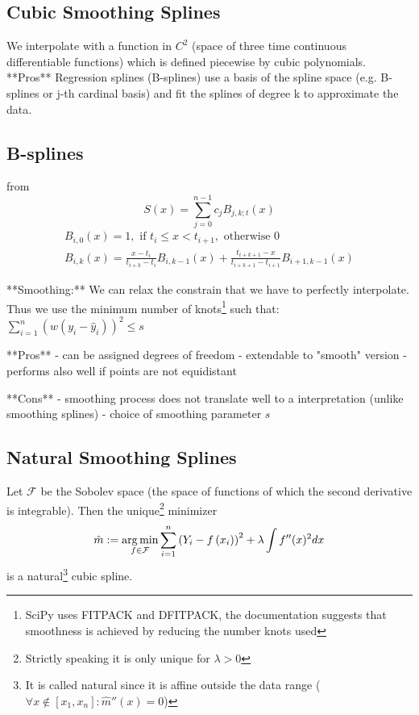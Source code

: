
\subsection{Cubic Smoothing Splines}
\label{sec:Cubic}
We interpolate with a function in $C^2$ (space of three time continuous differentiable functions) which is defined piecewise by cubic polynomials.
**Pros**
Regression splines (B-splines)
\cite{woodSmoothingParameterModel2016}
use a basis of the spline space (e.g. B-splines or j-th cardinal basis) and fit the splines of degree k to approximate the data.

\subsection{B-splines}
\label{sec:B}
from \cite{lycheSplineMethods2005}
$$
    S(x)=\sum_{j=0}^{n-1} c_{j} B_{j, k ; t}(x)
$$
$$
    \begin{array}{r}
        B_{i, 0}(x)=1, \text { if } t_{i} \leq x<t_{i+1}, \text { otherwise } 0 \\
        B_{i, k}(x)=\frac{x-t_{i}}{t_{i+k}-t_{i}} B_{i, k-1}(x)+\frac{t_{i+k+1}-x}{t_{i+k+1}-t_{i+1}} B_{i+1, k-1}(x)
    \end{array}
$$

**Smoothing:**
We can relax the constrain that we have to perfectly interpolate. Thus we use the minimum number of knots\footnote{SciPy uses FITPACK and DFITPACK, the documentation suggests that smoothness is achieved by reducing the number knots used} such that:
$\sum_{i=1}^n(w (y_i - \hat y_i))^2 \leq s$

**Pros**
- can be assigned degrees of freedom
- extendable to "smooth" version
- performs also well if points are not equidistant

**Cons**
- smoothing process does not translate well to a interpretation (unlike smoothing splines)
- choice of smoothing parameter $s$

\subsection{Natural Smoothing Splines}
\label{sec:Natural}
Let $\mathcal F$ be the Sobolev space (the space of functions of which the second derivative is integrable). Then the unique\footnote{Strictly speaking it is only unique for $\lambda > 0$} minimizer
$$\hat m :=\operatorname*{arg\, min}_{f \in \mathcal F} \sum_{i=1}^{n}\left(Y_{i}-{f}\left(x_{i}\right)\right)^{2}+\lambda \int {f}^{\prime \prime}(x)^{2} d x$$
is a natural\footnote{It is called natural since it is affine outside the data range ($\forall x\notin [x_1, x_n]:\hat m''(x) = 0$)} cubic spline.

